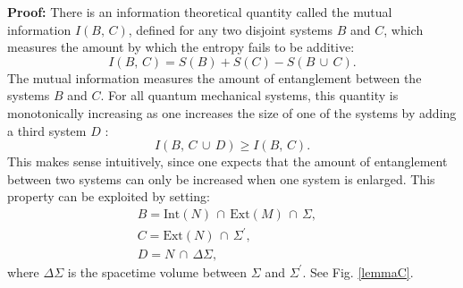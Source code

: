 \documentclass[12pt]{article}
\begin{document}
\textbf{Proof:} There is an information theoretical quantity called the mutual information $I(B,\,C)$, defined for any two disjoint systems $B$ and $C$, which measures the amount by which the entropy fails to be additive:
\begin{equation}\label{I}
I(B,\,C) = S(B) + S(C) - S(B\,\cup\,C).
\end{equation}
The mutual information measures the amount of entanglement between the systems $B$ and $C$.  For all quantum mechanical systems, this quantity is monotonically increasing as one increases the size of one of the systems by adding a third system $D$ \cite{Imono}:
\begin{equation}\label{mono}
I(B,\,C\,\cup\,D) \ge I(B,\,C).
\end{equation}
This makes sense intuitively, since one expects that the amount of entanglement between two systems can only be increased when one system is enlarged.  This property can be exploited by setting:
\begin{eqnarray}
B = \mathrm{Int}(N)\,\cap\,\mathrm{Ext}(M)\,\cap\,\Sigma, & \\
C = \mathrm{Ext}(N)\,\cap\,\Sigma^\prime, & \\
D = N\,\cap\,\Delta \Sigma, &
\end{eqnarray}
where $\Delta \Sigma$ is the spacetime volume between $\Sigma$ and $\Sigma^\prime$.  See Fig. \ref{lemmaC}.  
\end{document}

